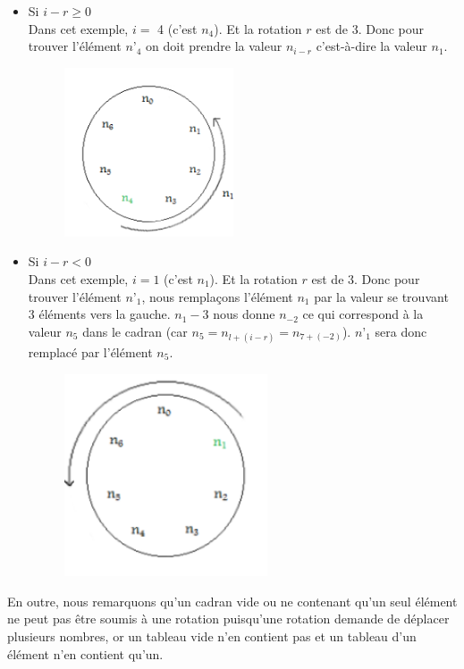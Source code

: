 	\begin{itemize}
		\item Si $ i - r \geq0 $ \\
		Dans cet exemple, $i=$ 4 (c’est $n_4$). Et la rotation $r$ est de 3. Donc pour trouver l’élément $n’_4$ on doit prendre la valeur $n_{i-r}$ c’est-à-dire la valeur $n_1$.
		\begin{figure}[h]
			\centering
			\includegraphics[height=5cm]{3}
			\caption{}
		\end{figure}
		\item Si $ i - r < 0 $ \\
		Dans cet exemple, $i=1$ (c’est $n_1$). Et la rotation $r$ est de 3. Donc pour trouver l’élément $n’_1$, nous remplaçons l’élément $n_1$ par la valeur se trouvant 3 éléments vers la gauche. $n_1 - 3$ nous donne $n_{-2}$ ce qui correspond à la valeur $n_5$ dans le cadran (car $n_5 = n_{l+(i-r)}=n_{7+(-2)}$). $n’_1$ sera donc remplacé par l’élément $n_5$.
		\begin{figure}[h]
			\centering
			\includegraphics[height=6cm]{4}
			\caption{}
		\end{figure}		
	\end{itemize}
	
	En outre, nous remarquons qu’un cadran vide ou ne contenant qu’un seul élément ne peut pas être soumis à une rotation puisqu’une rotation demande de déplacer plusieurs nombres, or un tableau vide n’en contient pas et un tableau d’un élément n’en contient qu’un.
	
